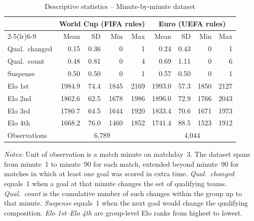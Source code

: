 \begin{table}[H]
\centering
\caption{Descriptive statistics -- Minute-by-minute dataset}
\label{tab:desc_stats_mbm}
\begin{threeparttable}
\begin{tabular}{lrrrrrrrr}
\toprule
 & \multicolumn{4}{c}{World Cup (FIFA rules)} & \multicolumn{4}{c}{Euro (UEFA rules)} \\
\cmidrule(lr){2-5}\cmidrule(lr){6-9}
 & Mean & SD & Min & Max & Mean & SD & Min & Max \\
\midrule
Qual.\ changed  & 0.15 & 0.36 & 0 & 1 & 0.24 & 0.43 & 0 & 1 \\
Qual.\ count    & 0.48 & 0.81 & 0 & 4 & 0.69 & 1.11 & 0 & 6 \\
Suspense        & 0.50 & 0.50 & 0 & 1 & 0.57 & 0.50 & 0 & 1 \\
Elo 1st         & 1984.9 & 74.4 & 1845 & 2169 & 1993.0 & 57.3 & 1850 & 2127 \\
Elo 2nd         & 1862.6 & 62.5 & 1678 & 1986 & 1896.0 & 72.9 & 1766 & 2043 \\
Elo 3rd         & 1780.7 & 64.5 & 1644 & 1920 & 1833.4 & 70.6 & 1671 & 1973 \\
Elo 4th         & 1668.2 & 76.0 & 1460 & 1852 & 1741.4 & 88.5 & 1523 & 1912 \\
\midrule
Observations    & \multicolumn{4}{c}{6{,}789} & \multicolumn{4}{c}{4{,}044} \\
\bottomrule
\end{tabular}
\begin{tablenotes}
\small
\item \textit{Notes:} Unit of observation is a match minute on matchday~3. The dataset spans from minute~1 to minute~90 for each match, extended beyond minute~90 for matches in which at least one goal was scored in extra time. \textit{Qual.\ changed} equals~1 when a goal at that minute changes the set of qualifying teams. \textit{Qual.\ count} is the cumulative number of such changes within the group up to that minute. \textit{Suspense} equals~1 when the next goal would change the qualifying composition. \textit{Elo 1st}--\textit{Elo 4th} are group-level Elo ranks from highest to lowest.
\end{tablenotes}
\end{threeparttable}
\end{table}
